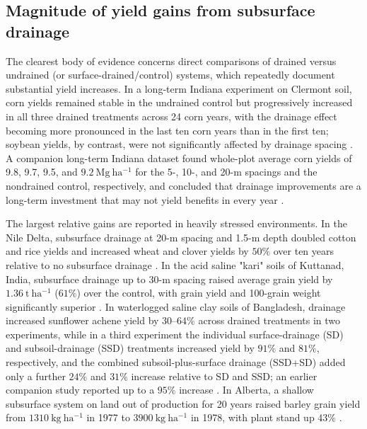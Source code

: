 \documentclass[11pt]{article}
\begin{document}
\subsection{Magnitude of yield gains from subsurface drainage}

The clearest body of evidence concerns direct comparisons of drained versus undrained (or surface-drained/control) systems, which repeatedly document substantial yield increases. In a long-term Indiana experiment on Clermont soil, corn yields remained stable in the undrained control but progressively increased in all three drained treatments across 24 corn years, with the drainage effect becoming more pronounced in the last ten corn years than in the first ten; soybean yields, by contrast, were not significantly affected by drainage spacing \parencite{Rui2024}. A companion long-term Indiana dataset found whole-plot average corn yields of 9.8, 9.7, 9.5, and \(9.2\ \mathrm{Mg\ ha^{-1}}\) for the 5-, 10-, and 20-m spacings and the nondrained control, respectively, and concluded that drainage improvements are a long-term investment that may not yield benefits in every year \parencite{Kladivko2005}.

The largest relative gains are reported in heavily stressed environments. In the Nile Delta, subsurface drainage at 20-m spacing and 1.5-m depth doubled cotton and rice yields and increased wheat and clover yields by \(50\%\) over ten years relative to no subsurface drainage \parencite{ELMOWELHI1988}. In the acid saline "kari" soils of Kuttanad, India, subsurface drainage up to 30-m spacing raised average grain yield by \(1.36\ \mathrm{t\ ha^{-1}}\) (\(61\%\)) over the control, with grain yield and 100-grain weight significantly superior \parencite{Mathew2001}. In waterlogged saline clay soils of Bangladesh, drainage increased sunflower achene yield by \(30\textrm{--}64\%\) across drained treatments in two experiments, while in a third experiment the individual surface-drainage (SD) and subsoil-drainage (SSD) treatments increased yield by \(91\%\) and \(81\%\), respectively, and the combined subsoil-plus-surface drainage (SSD+SD) added only a further \(24\%\) and \(31\%\) increase relative to SD and SSD; an earlier companion study reported up to a \(95\%\) increase \parencite{Islam2025,Islam2022}. In Alberta, a shallow subsurface system on land out of production for 20 years raised barley grain yield from \(1310\ \mathrm{kg\ ha^{-1}}\) in 1977 to \(3900\ \mathrm{kg\ ha^{-1}}\) in 1978, with plant stand up \(43\%\) \parencite{BENNETT1982}.
\end{document}
